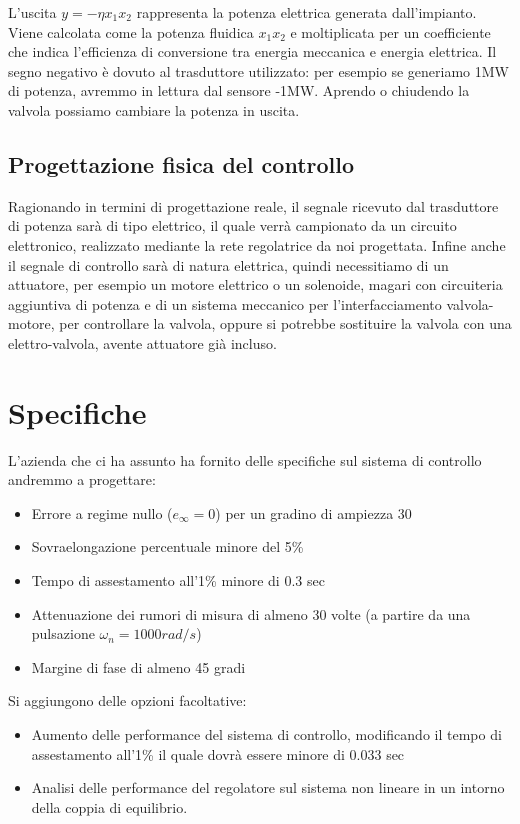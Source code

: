 \documentclass{article}
\begin{document}
L'uscita $y=-\eta x_1 x_2$ rappresenta la potenza elettrica generata dall'impianto. Viene calcolata come la potenza fluidica $x_1 x_2$ e moltiplicata per un coefficiente che indica l'efficienza di conversione tra energia meccanica e energia elettrica. Il segno negativo è dovuto al trasduttore utilizzato: per esempio se generiamo 1MW di potenza, avremmo in lettura dal sensore -1MW. Aprendo o chiudendo la valvola possiamo cambiare la potenza in uscita.


\subsection{Progettazione fisica del controllo}

Ragionando in termini di progettazione reale, il segnale ricevuto dal trasduttore di potenza sarà di tipo elettrico, il quale verrà campionato da un circuito elettronico, realizzato mediante la rete regolatrice da noi progettata. 
Infine anche il segnale di controllo sarà di natura elettrica, quindi necessitiamo di un attuatore, per esempio un motore elettrico o un solenoide, magari con circuiteria aggiuntiva di potenza e di un sistema meccanico per l'interfacciamento valvola-motore, per controllare la valvola, oppure si potrebbe sostituire la valvola con una elettro-valvola, avente attuatore già incluso.

\section{Specifiche}

L'azienda che ci ha assunto ha fornito delle specifiche sul sistema di controllo andremmo a progettare:

\begin{itemize}
    \item Errore a regime nullo ($e_{\infty}=0$) per un gradino di ampiezza 30
    \item Sovraelongazione percentuale minore del 5\%
    \item Tempo di assestamento all'1\% minore di 0.3 sec
    \item Attenuazione dei rumori di misura di almeno 30 volte (a partire da una pulsazione $\omega_n=1000 rad/s$)
    \item Margine di fase di almeno 45 gradi
\end{itemize}

Si aggiungono delle opzioni facoltative:
\begin{itemize}
    \item Aumento delle performance del sistema di controllo, modificando il tempo di assestamento all'1\% il quale dovrà essere minore di 0.033 sec
    \item Analisi delle performance del regolatore sul sistema non lineare in un intorno della coppia di equilibrio.
\end{itemize}
\end{document}
